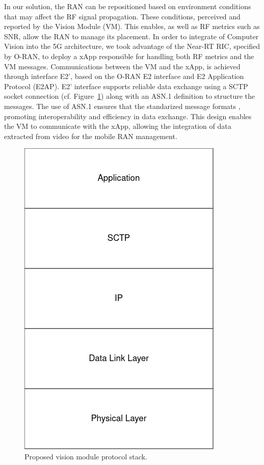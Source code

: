 
In our solution, the RAN can be repositioned based on environment conditions that may affect the RF signal propagation\@.
These conditions, perceived and reported by the Vision Module (VM).
This enables, as well as RF metrics such as SNR, allow the RAN to manage its placement.
In order to integrate of Computer Vision into the 5G architecture, we took advantage of the Near-RT RIC, specified by O-RAN, to deploy a xApp responsible for handling both RF metrics and the VM messages.
Communications between the VM and the xApp, is achieved through interface E2', based on the O-RAN E2 interface and E2 Application Protocol (E2AP).
E2' interface supports reliable data exchange using a SCTP socket connection (cf.
Figure~\ref{fig:stack}) along with an ASN.1 definition to structure the messages.
The use of ASN.1 ensures that the standarized message formats , promoting interoperability and efficiency in data exchange.
This design enables the VM to communicate with the xApp, allowing the integration of data extracted from video for the mobile RAN management.

\begin{figure}[H]
    \centering
    \includegraphics[width=0.2\linewidth]{figures/VisionModule_ProtocolStack.drawio(2)}
    \caption[Proposed Vision Module Protocol Stack]{Proposed vision module protocol stack.}
    \label{fig:stack}
\end{figure}


